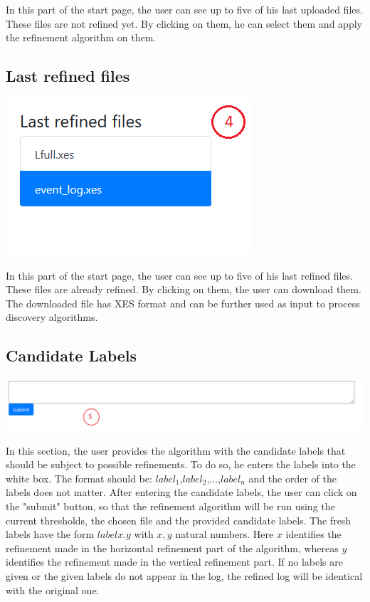 \documentclass[notitlepage]{article}
\begin{document}
In this part of the start page, the user can see up to five of his last uploaded files. 
These files are not refined yet.
By clicking on them, he can select them and apply the refinement algorithm on them.

\subsection{Last refined files}

\includegraphics[scale=0.6]{lastRefinedFiles.png}

In this part of the start page, the user can see up to five of his last refined files. 
These files are already refined. 
By clicking on them, the user can download them.
The downloaded file has XES format and can be further used as input to process discovery algorithms.

\subsection{Candidate Labels}

\includegraphics[scale=0.5]{candidateLabels.png}

In this section, the user provides the algorithm with the candidate labels that should be subject to possible refinements. 
To do so, he enters the labels into the white box. 
The format should be: $label_1$,$label_2$,...,$label_n$ and the order of the labels does not matter.
After entering the candidate labels, the user can click on the "submit" button, so that the refinement algorithm will be run using the current thresholds, the chosen file and the provided candidate labels.
The fresh labels have the form $labelx.y$ with $x,y$ natural numbers.
Here $x$ identifies the refinement made in the horizontal refinement part of the algorithm, whereas $y$ identifies the refinement made in the vertical refinement part. 
If no labels are given or the given labels do not appear in the log, the refined log will be identical with the original one.
\end{document}

